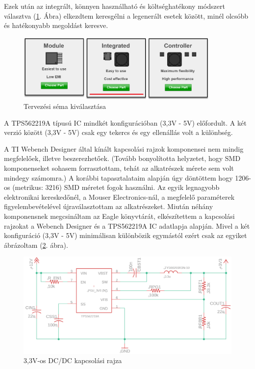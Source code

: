 \documentclass[../main.tex]{subfiles}
\begin{document}
            Ezek után az integrált, könnyen használható és költséghatékony módszert választva (\ref{fig:ti_we_des_int_etu_ce_method}. Ábra) elkezdtem keresgélni a legenerált esetek között, minél olcsóbb és hatékonyabb megoldást keresve. %
            
            \begin{figure}[h!]
                \centering
                    \includegraphics[width=10cm]{resources/pcb_res/ti_we_des_int_etu_ce_method_2.png}
                \caption{Tervezési séma kiválasztása}
                \label{fig:ti_we_des_int_etu_ce_method}
            \end{figure}
            
            A TPS562219A típusú IC mindkét konfigurációban (3,3V - 5V) előfordult. A két verzió között (3,3V - 5V) csak egy tekercs és egy ellenállás volt a különbség.
            
            A TI Webench Designer által kínált kapcsolási rajzok komponensei nem mindig megfelelőek, illetve beszerezhetőek. (Tovább bonyolította helyzetet, hogy SMD komponenseket sohasem forrasztottam, tehát az alkatrészek mérete sem volt mindegy számomra.) A korábbi tapasztalataim alapján úgy döntöttem hogy 1206-os (metrikus: 3216) SMD méretet fogok használni. Az egyik legnagyobb elektronikai kereskedőnél, a Mouser Electronics-nál, a megfelelő paraméterek figyelembevételével újraválasztottam az alkatrészeket. Miután néhány komponensnek megcsináltam az Eagle könyvtárát, elkészítettem a kapcsolási rajzokat a Webench Designer és a TPS562219A IC adatlapja alapján. Mivel a két konfiguráció (3,3V - 5V) minimálisan különbözik egymástól ezért csak az egyiket ábrázoltam (\ref{fig:schematic_3v3}. ábra).
            
            \begin{figure}[h!]
                \centering
                    \includegraphics[width=12cm]{resources/pcb_res/schematic_3v3.png}
                \caption{3,3V-os DC/DC kapcsolási rajza}
                \label{fig:schematic_3v3}
            \end{figure}
            
\end{document}
